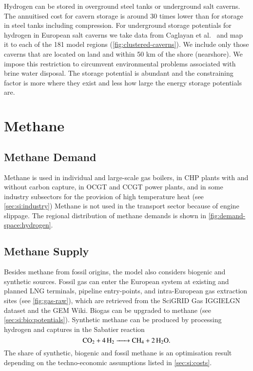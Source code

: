 Hydrogen can be stored in overground steel tanks or underground salt caverns.
The annuitised cost for cavern storage is around 30 times lower than for storage
in steel tanks including compression. For underground storage potentials for
hydrogen in European salt caverns we take data from Caglayan et
al.~ and map it to
each of the 181 model regions (\cref{fig:clustered-caverns}). We include only
those caverns that are located on land and within 50 km of the shore
(nearshore). We impose this restriction to circumvent environmental problems
associated with brine water disposal. The
storage potential is abundant and the constraining factor is more where they
exist and less how large the energy storage potentials are.

\section{Methane}
\label{sec:si:methane}

\subsection{Methane Demand}
\label{sec:si:methane:demand}

Methane is used in individual and large-scale gas boilers, in CHP plants with
and without carbon capture, in OCGT and CCGT power plants, and in some industry
subsectors for the provision of high temperature heat (see
\cref{sec:si:industry}) Methane is not used in the transport sector because of
engine slippage. The regional distribution of methane demands is shown in
\cref{fig:demand-space:hydrogen}.

\subsection{Methane Supply}
\label{sec:si:methane:supply}

Besides methane from fossil origins, the model also considers biogenic and
synthetic sources. Fossil gas can enter the European system at existing and
planned LNG terminals, pipeline entry-points, and intra-European gas extraction
sites (see \cref{fig:gas-raw}), which are retrieved from the SciGRID Gas
IGGIELGN dataset and the GEM
Wiki. Biogas can be upgraded to methane (see
\cref{sec:si:bio:potentials}). Synthetic methane can be produced by processing
hydrogen and captures \co in the Sabatier reaction
\begin{equation}
    \ce{CO2 + 4H2 -> CH4 + 2H2O}.
\end{equation}
The share of synthetic, biogenic and fossil methane is an optimisation result
depending on the techno-economic assumptions listed in \cref{sec:si:costs}.

